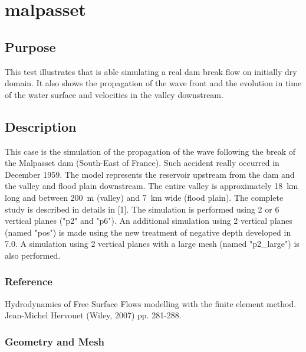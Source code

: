 \chapter{malpasset}
%
%
\section{Purpose}
%
This test illustrates that  is able simulating a real dam
break flow on initially dry domain.
It also shows the propagation of the wave front and the evolution in
time of the water surface and velocities in the valley downstream.
%
\section{Description}
%
This case is the simulation of the propagation of the wave following the
break of the Malpasset dam (South-East of France).
Such accident really occurred in December 1959.
The model represents the reservoir upstream from the dam and the valley
and flood plain downstream.
The entire valley is approximately 18~km long and between 200~m (valley)
and 7~km wide (flood plain).
The complete study is described in details in [1].
The simulation is performed using 2 or 6 vertical planes ("p2" and
"p6").
An additional simulation using 2 vertical planes (named "pos") is
made using the new treatment of negative depth developed in
 7.0.
A simulation using 2 vertical planes with a large mesh (named
"p2\_large") is also performed.
%
%
%
%
\subsection{Reference}
%
Hydrodynamics of Free Surface Flows modelling with the finite element
method. Jean-Michel Hervouet (Wiley, 2007) pp. 281-288.
%
%
%
\subsection{Geometry and Mesh}
%
